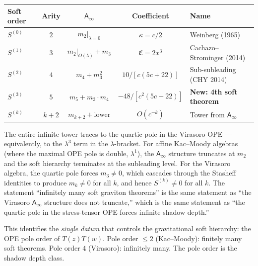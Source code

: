 \documentclass[11pt]{article}
\newcommand{\Ainf}{\mathsf{A}_{\infty}}
\begin{document}
\begin{center}
\renewcommand{\arraystretch}{1.3}
\begin{tabular}{lcccl}
\hline
\textbf{Soft order} & \textbf{Arity} & \textbf{$\Ainf$}
  & \textbf{Coefficient} & \textbf{Name} \\
\hline
$S^{(0)}$ & $2$ & $m_2|_{\lambda=0}$
  & $\kappa = c/2$ & Weinberg (1965) \\
$S^{(1)}$ & $3$ & $m_2|_{O(\lambda)} + m_3$
  & $\mathfrak{C} = 2x^3$ & Cachazo--Strominger (2014) \\
$S^{(2)}$ & $4$ & $m_4 + m_3^2$
  & $10/[c(5c+22)]$ & Sub-subleading (CHY 2014) \\
$S^{(3)}$ & $5$ & $m_5 + m_3 \cdot m_4$
  & $-48/[c^2(5c+22)]$ & \textbf{New: 4th soft theorem} \\
$S^{(k)}$ & $k+2$ & $m_{k+2} + \text{lower}$
  & $O(c^{-k})$ & Tower from $\Ainf$ \\
\hline
\end{tabular}
\end{center}

\begin{remark}
The entire infinite tower traces to the quartic pole in the Virasoro OPE --- equivalently, to the $\lambda^3$ term in the $\lambda$-bracket.  For affine Kac--Moody algebras (where the maximal OPE pole is double, $\lambda^1$), the $\Ainf$ structure truncates at $m_2$ and the soft hierarchy terminates at the subleading level.  For the Virasoro algebra, the quartic pole forces $m_3 \ne 0$, which cascades through the Stasheff identities to produce $m_k \ne 0$ for all $k$, and hence $S^{(k)} \ne 0$ for all $k$.  The statement ``infinitely many soft graviton theorems'' is the same statement as ``the Virasoro $\Ainf$ structure does not truncate,'' which is the same statement as ``the quartic pole in the stress-tensor OPE forces infinite shadow depth.''

This identifies the \emph{single datum} that controls the gravitational soft hierarchy: the OPE pole order of $T(z)T(w)$.  Pole order $\le 2$ (Kac--Moody): finitely many soft theorems.  Pole order $4$ (Virasoro): infinitely many.  The pole order is the shadow depth class.
\end{remark}
\end{document}
